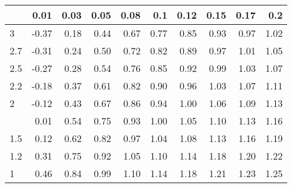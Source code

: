 
\begin{tabular}{lrrrrrrrrr}
\toprule
  & 0.01 & 0.03 & 0.05 & 0.08 & 0.1 & 0.12 & 0.15 & 0.17 & 0.2\\
\midrule
3 & -0.37 & 0.18 & 0.44 & 0.67 & 0.77 & 0.85 & 0.93 & 0.97 & 1.02\\
2.7 & -0.31 & 0.24 & 0.50 & 0.72 & 0.82 & 0.89 & 0.97 & 1.01 & 1.05\\
2.5 & -0.27 & 0.28 & 0.54 & 0.76 & 0.85 & 0.92 & 0.99 & 1.03 & 1.07\\
2.2 & -0.18 & 0.37 & 0.61 & 0.82 & 0.90 & 0.96 & 1.03 & 1.07 & 1.11\\
2 & -0.12 & 0.43 & 0.67 & 0.86 & 0.94 & 1.00 & 1.06 & 1.09 & 1.13\\
\addlinespace
1.7 & 0.01 & 0.54 & 0.75 & 0.93 & 1.00 & 1.05 & 1.10 & 1.13 & 1.16\\
1.5 & 0.12 & 0.62 & 0.82 & 0.97 & 1.04 & 1.08 & 1.13 & 1.16 & 1.19\\
1.2 & 0.31 & 0.75 & 0.92 & 1.05 & 1.10 & 1.14 & 1.18 & 1.20 & 1.22\\
1 & 0.46 & 0.84 & 0.99 & 1.10 & 1.14 & 1.18 & 1.21 & 1.23 & 1.25\\
\bottomrule
\end{tabular}
